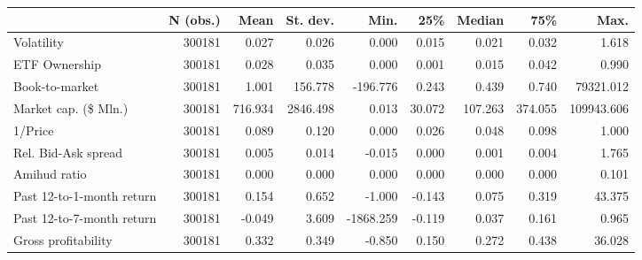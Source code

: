 \begin{tabular}{lrrrrrrrr}
\toprule
{} & N (obs.) &    Mean & St. dev. &      Min. &    25\% &  Median &     75\% &       Max. \\
\midrule
Volatility                &   300181 &   0.027 &    0.026 &     0.000 &  0.015 &   0.021 &   0.032 &      1.618 \\
ETF Ownership             &   300181 &   0.028 &    0.035 &     0.000 &  0.001 &   0.015 &   0.042 &      0.990 \\
Book-to-market            &   300181 &   1.001 &  156.778 &  -196.776 &  0.243 &   0.439 &   0.740 &  79321.012 \\
Market cap. (\$ Mln.)      &   300181 & 716.934 & 2846.498 &     0.013 & 30.072 & 107.263 & 374.055 & 109943.606 \\
1/Price                   &   300181 &   0.089 &    0.120 &     0.000 &  0.026 &   0.048 &   0.098 &      1.000 \\
Rel. Bid-Ask spread       &   300181 &   0.005 &    0.014 &    -0.015 &  0.000 &   0.001 &   0.004 &      1.765 \\
Amihud ratio              &   300181 &   0.000 &    0.000 &     0.000 &  0.000 &   0.000 &   0.000 &      0.101 \\
Past 12-to-1-month return &   300181 &   0.154 &    0.652 &    -1.000 & -0.143 &   0.075 &   0.319 &     43.375 \\
Past 12-to-7-month return &   300181 &  -0.049 &    3.609 & -1868.259 & -0.119 &   0.037 &   0.161 &      0.965 \\
Gross profitability       &   300181 &   0.332 &    0.349 &    -0.850 &  0.150 &   0.272 &   0.438 &     36.028 \\
\bottomrule
\end{tabular}
